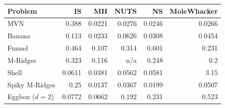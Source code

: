 \begin{tabular}{lrrrrr}
\toprule
Problem & IS & MH & NUTS & NS & MoleWhacker \\
\midrule
MVN & 0.388 & 0.0221 & 0.0276 & 0.0246 & 0.0266 \\
Banana & 0.113 & 0.0233 & 0.0626 & 0.0308 & 0.0454 \\
Funnel & 0.464 & 0.107 & 0.314 & 0.601 & 0.231 \\
M-Ridges & 0.323 & 0.116 & n/a & 0.248 & 0.2 \\
Shell & 0.0611 & 0.0381 & 0.0562 & 0.0581 & 3.15 \\
Spiky M-Ridges & 0.25 & 0.0137 & 0.0367 & 0.0199 & 0.0507 \\
\midrule
Eggbox ($d=2$) & 0.0772 & 0.0662 & 0.192 & 0.231 & 0.523 \\
\bottomrule
\end{tabular}

